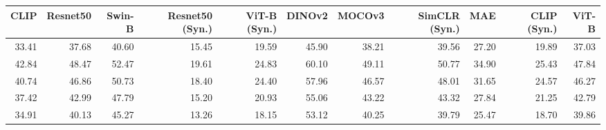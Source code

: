\begin{tabular}{rrrrrrrrrrr}
\toprule
CLIP & Resnet50 & Swin-B & Resnet50 (Syn.) & ViT-B (Syn.) & DINOv2 & MOCOv3 & SimCLR (Syn.) & MAE & CLIP (Syn.) & ViT-B \\
\midrule
33.41 & 37.68 & 40.60 & 15.45 & 19.59 & 45.90 & 38.21 & 39.56 & 27.20 & 19.89 & 37.03 \\
42.84 & 48.47 & 52.47 & 19.61 & 24.83 & 60.10 & 49.11 & 50.77 & 34.90 & 25.43 & 47.84 \\
40.74 & 46.86 & 50.73 & 18.40 & 24.40 & 57.96 & 46.57 & 48.01 & 31.65 & 24.57 & 46.27 \\
37.42 & 42.99 & 47.79 & 15.20 & 20.93 & 55.06 & 43.22 & 43.32 & 27.84 & 21.25 & 42.79 \\
34.91 & 40.13 & 45.27 & 13.26 & 18.15 & 53.12 & 40.25 & 39.79 & 25.47 & 18.70 & 39.86 \\
\bottomrule
\end{tabular}
